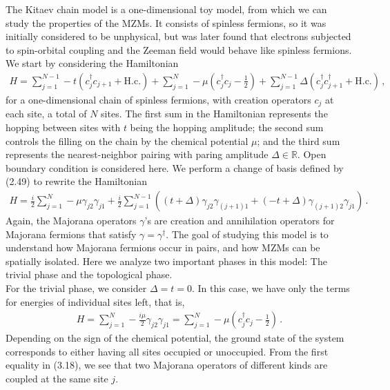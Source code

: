 \documentclass[11pt, oneside]{book}
\theoremstyle{break}
\theoremstyle{break}
\newcommand{\R}{\mathbb{R}}
\begin{document}
The Kitaev chain model is a one-dimensional toy model, from which we can study the properties of the MZMs. It consists of spinless fermions, so it was initially considered to be unphysical, but was later found that electrons subjected to spin-orbital coupling and the Zeeman field would behave like spinless fermions. We start by considering the Hamiltonian 
\begin{align}
H = \sum_{j=1}^{N-1} 
-t \left(c_j^\dagger c_{j+1} + \text{H.c.}\right) +
\sum_{j=1}^N- \mu \left( c_j^\dagger c_j - \frac{1}{2}\right) +
\sum_{j=1}^{N-1}\Delta \left( c_j^\dagger c_{j+1}^\dagger + \text{H.c.}\right)\,,
\end{align}
for a one-dimensional chain of spinless fermions, with creation operators $c_j$ at each site, a total of $N$ sites. The first sum in the Hamiltonian represents the hopping between sites with $t$ being the hopping amplitude; the second sum controls the filling on the chain by the chemical potential $\mu$; and the third sum represents the nearest-neighbor pairing with paring amplitude $\Delta \in\R$. Open boundary condition is considered here. We perform a change of basis defined by (2.49) to rewrite the Hamiltonian
\begin{align}
H = \frac{i}{2}\sum_{j=1}^{N}  -\mu \gamma_{j2}\gamma_{j1} +\frac{i}{2} \sum_{j=1}^{N-1} \left((t+\Delta)\gamma_{j2}\gamma_{(j+1)1} + (-t+\Delta) \gamma_{(j+1)2}\gamma_{j1}\right)\,.
\end{align}
Again, the Majorana operators $\gamma$'s are creation and annihilation operators for Majorana fermions that satisfy $\gamma = \gamma^\dagger$. 
The goal of studying this model is to understand how Majorana fermions occur in pairs, and how MZMs can be spatially isolated. Here we analyze two important phases in this model: The trivial phase and the topological phase. \\


For the trivial phase, we consider $\Delta = t = 0$. In this case, we have only the terms for energies of individual sites left, that is, 
\begin{align}
H = \sum_{j=1}^N -\frac{i\mu}{2}\gamma_{j2}\gamma_{j1} = \sum_{j=1}^{N}-\mu \left( c_j^\dagger c_j - \frac{1}{2}\right)\,.
\end{align}
Depending on the sign of the chemical potential, the ground state of the system corresponds to either having all sites occupied or unoccupied. From the first equality in (3.18), we see that two Majorana operators of different kinds are coupled at the same site $j$.\\
\end{document}

